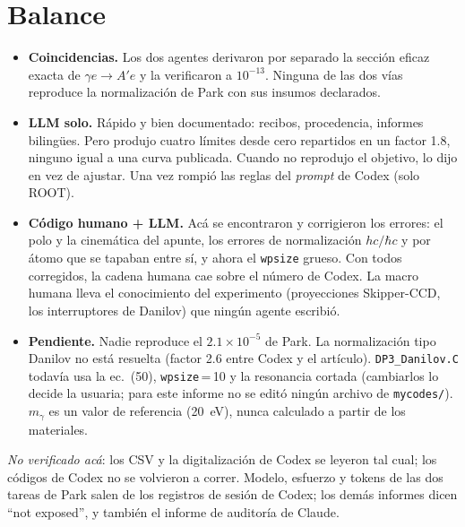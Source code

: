 \documentclass[10pt,a4paper]{article}
\newcommand{\Ap}{A'}
\newcommand{\ttt}[1]{\texttt{\small #1}}
\begin{document}
\section{Balance}
\begin{itemize}
\item \textbf{Coincidencias.} Los dos agentes derivaron por separado la sección eficaz exacta de $\gamma e\to\Ap e$ y la
verificaron a $10^{-13}$. Ninguna de las dos vías reproduce la normalización de Park con sus insumos declarados.
\item \textbf{LLM solo.} Rápido y bien documentado: recibos, procedencia, informes bilingües. Pero produjo cuatro límites
desde cero repartidos en un factor 1.8, ninguno igual a una curva publicada. Cuando no reprodujo el objetivo, lo dijo en vez
de ajustar. Una vez rompió las reglas del \emph{prompt} de Codex (solo ROOT).
\item \textbf{Código humano + LLM.} Acá se encontraron y corrigieron los errores: el polo y la cinemática del apunte, los
errores de normalización $hc/\hbar c$ y por átomo que se tapaban entre sí, y ahora el \ttt{wpsize} grueso. Con todos
corregidos, la cadena humana cae sobre el número de Codex. La macro humana lleva el conocimiento del experimento
(proyecciones Skipper-CCD, los interruptores de Danilov) que ningún agente escribió.
\item \textbf{Pendiente.} Nadie reproduce el $2.1\times10^{-5}$ de Park. La normalización tipo Danilov no está resuelta
(factor 2.6 entre Codex y el artículo). \ttt{DP3\_Danilov.C} todavía usa la ec.~(50), \ttt{wpsize}\,=\,10 y la resonancia
cortada (cambiarlos lo decide la usuaria; para este informe no se editó ningún archivo de \ttt{mycodes/}). $m_\gamma$ es un
valor de referencia (20~eV), nunca calculado a partir de los materiales.
\end{itemize}

\noindent\textit{No verificado acá}: los CSV y la digitalización de Codex se leyeron tal cual; los códigos de Codex no se
volvieron a correr. Modelo, esfuerzo y tokens de las dos tareas de Park salen de los registros de sesión de Codex; los demás
informes dicen ``not exposed'', y también el informe de auditoría de Claude.
\end{document}
